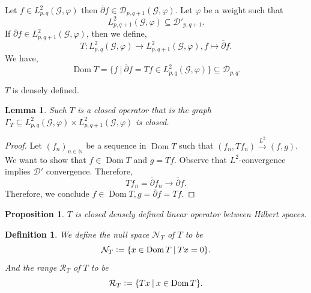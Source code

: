 \documentclass{article}
\newtheorem{proposition}{Proposition}[section]
\newtheorem{definition}{Definition}[section]
\newtheorem{lemma}{Lemma}[section]
\DeclareMathOperator{\Dom}{Dom}
\newcommand{\defeq}{\vcentcolon=}
\newcommand{\N}[0]{\mathbb{N}}
\newcommand{\G}[0]{\mathcal{G}}
\newcommand{\sep}[0]{\:|\:}
\begin{document}
  Let $f\in L_{p,q}^2(\G,\varphi)$ then $\overline{\partial}f\in\mathcal{D}_{p,q+1}(\G,\varphi)$. Let $\varphi$ be a weight such that
  \begin{equation*}
    L^2_{p,q+1}(\G,\varphi)\subseteq \mathcal{D}'_{p,q+1}.
  \end{equation*}
  If $\overline{\partial}f\in L_{p,q+1}^2(\G,\varphi)$, then we define,
  \begin{equation*}
    T:L_{p,q}^2(\G,\varphi)\to L^2_{p,q+1}(\G,\varphi), f\mapsto\overline{\partial}f.
  \end{equation*}
  We have,
  \begin{equation*}
    \Dom T = \{f\sep \overline{\partial}f=Tf\in L_{p,q}^2(\G,\varphi)\}\subseteq \mathcal{D}_{p,q}.
  \end{equation*}

 $T$ is densely defined.

 \begin{lemma}
  Such $T$ is a closed operator that is the graph $\Gamma_T\subseteq L_{p,q}^2(\G,\varphi)\times L_{p,q+1}^2(\G,\varphi)$ is closed.
 \end{lemma}

 \begin{proof}
  Let $(f_n)_{n\in \N}$ be a sequence in $\Dom T$ such that $(f_n,Tf_n)\stackrel{L^2}{\to}(f,g)$. We want to show that $f\in\Dom T$ and $g = Tf$.
  Observe that $L^2$-convergence implies $\mathcal{D}'$ convergence. Therefore, 
  \begin{equation*}
    Tf_n = \overline{\partial}f_n \to \overline{\partial}f.
  \end{equation*}
  Therefore, we conclude $f\in \Dom T, g=\overline{\partial}f = Tf$. 
 \end{proof}

 \begin{proposition}
  $T$ is closed densely defined linear operator between Hilbert spaces.
 \end{proposition}

 \begin{definition}
    We define the null space $\mathcal{N}_T$ of $T$ to be
    \begin{equation*}
    \mathcal{N}_T \defeq \{x\in\Dom T\sep Tx = 0\}.
    \end{equation*}
    And the range $\mathcal{R}_T$ of $T$ to be 
    \begin{equation*}
      \mathcal{R}_T\defeq \{Tx\sep x\in\Dom T\}.
    \end{equation*}
  \end{definition}
\end{document}
